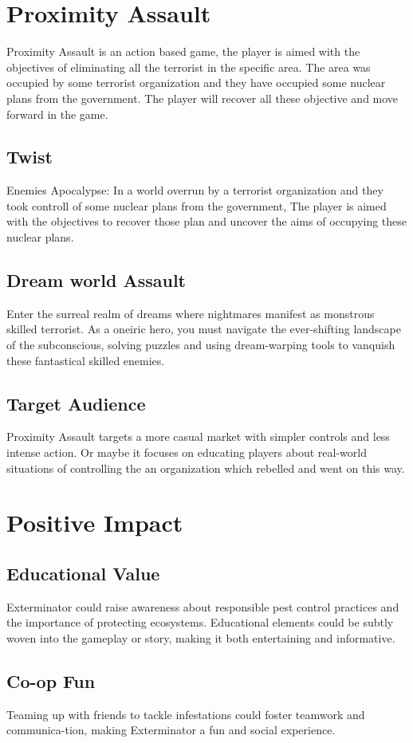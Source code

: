 \section{Proximity Assault}
Proximity Assault is an action based game, the player is aimed with the objectives of eliminating all the terrorist in the specific area. The area was occupied by some terrorist organization and they have occupied some nuclear plans from the government. The player will recover all these objective and move forward in the game.
\subsection{Twist}
Enemies Apocalypse: In a world overrun by a terrorist organization and they took controll of some nuclear plans from the government, The player is aimed with the objectives to recover those plan and uncover the aims of occupying these nuclear plans.\\
\subsection{Dream world Assault} Enter the surreal realm of dreams where nightmares manifest as monstrous skilled terrorist. As a oneiric hero, you must navigate the ever-shifting landscape of the subconscious, solving puzzles and using dream-warping tools to vanquish these fantastical skilled enemies.
\subsection{Target Audience} Proximity Assault targets a more casual market with simpler controls and less intense action. Or maybe it focuses on educating players about real-world situations of controlling the an organization which rebelled and went on this way.
\section{Positive Impact}

\subsection{Educational Value }
Exterminator could raise awareness about responsible pest control practices and the importance of protecting ecosystems. Educational elements could be subtly woven into the gameplay or story, making it both entertaining and informative.
\subsection{Co-op Fun} Teaming up with friends to tackle infestations could foster teamwork and communica-tion, making Exterminator a fun and social experience.

